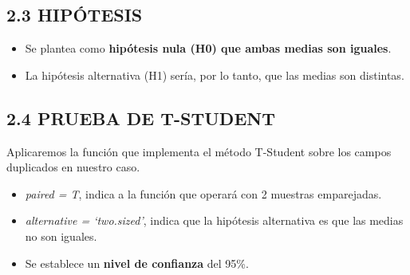 \documentclass[
  12 pt,
  a4paper,
]{article}
\newenvironment{Shaded}{\begin{snugshade}}{\end{snugshade}}
\newcommand{\ConstantTok}[1]{\textcolor[rgb]{0.56,0.35,0.01}{#1}}
\newcommand{\DecValTok}[1]{\textcolor[rgb]{0.00,0.00,0.81}{#1}}
\newcommand{\NormalTok}[1]{#1}
\newcommand{\OtherTok}[1]{\textcolor[rgb]{0.56,0.35,0.01}{#1}}
\newcommand{\SpecialCharTok}[1]{\textcolor[rgb]{0.81,0.36,0.00}{\textbf{#1}}}
\providecommand{\tightlist}{%
  \setlength{\itemsep}{0pt}\setlength{\parskip}{0pt}}
\begin{document}
\begin{Shaded}
\end{Shaded}

\subsection{2.3 HIPÓTESIS}\label{hipuxf3tesis}

\begin{itemize}
\tightlist
\item
  Se plantea como \textbf{hipótesis nula (H0) que ambas medias son
  iguales}.
\item
  La hipótesis alternativa (H1) sería, por lo tanto, que las medias son
  distintas.
\end{itemize}

\subsection{2.4 PRUEBA DE T-STUDENT}\label{prueba-de-t-student}

Aplicaremos la función que implementa el método T-Student sobre los
campos duplicados en nuestro caso.

\begin{itemize}
\item
  \emph{paired = T}, indica a la función que operará con 2 muestras
  emparejadas.
\item
  \emph{alternative = `two.sized'}, indica que la hipótesis alternativa
  es que las medias no son iguales.
\item
  Se establece un \textbf{nivel de confianza} del 95\%.
\end{itemize}
\end{document}
